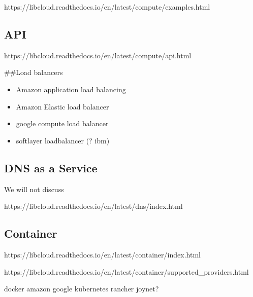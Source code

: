 https://libcloud.readthedocs.io/en/latest/compute/examples.html

\subsection{API}

https://libcloud.readthedocs.io/en/latest/compute/api.html

\#\#Load balancers

\begin{itemize}
\item
  Amazon application load balancing
\item
  Amazon Elastic load balancer
\item
  google compute load balancer
\item
  softlayer loadbalancer (? ibm)
\end{itemize}

\subsection{DNS as a Service}

We will not discuss

https://libcloud.readthedocs.io/en/latest/dns/index.html

\subsection{Container}

https://libcloud.readthedocs.io/en/latest/container/index.html

https://libcloud.readthedocs.io/en/latest/container/supported\_providers.html

docker amazon google kubernetes rancher joynet?

